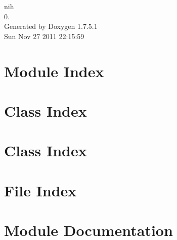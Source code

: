 \documentclass[a4paper]{book}
\begin{document}
\hypersetup{pageanchor=false,citecolor=blue}
\begin{titlepage}
\vspace*{7cm}
\begin{center}
{\Large nih \\[1ex]\large 0. }\\
\vspace*{1cm}
{\large \-Generated by Doxygen 1.7.5.1}\\
\vspace*{0.5cm}
{\small Sun Nov 27 2011 22:15:59}\\
\end{center}
\end{titlepage}
\clearemptydoublepage
{}
\tableofcontents
\clearemptydoublepage
{}
\hypersetup{pageanchor=true,citecolor=blue}
\chapter{\-Module \-Index}

\chapter{\-Class \-Index}

\chapter{\-Class \-Index}

\chapter{\-File \-Index}

\chapter{\-Module \-Documentation}





















\end{document}
